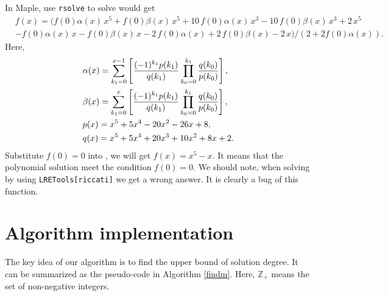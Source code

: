 \begin{example}
In Maple, use \texttt{rsolve} to solve  would get
\begin{equation}
\begin{split}
    &f(x)=(f \left( 0 \right) \alpha(x)\,{x}^{5}+f \left( 0 \right) \beta(x)\,{x}^{5}+10\,f \left( 0 \right) \alpha(x)\,{x}^{3}-10\,f \left( 0 \right) \beta(x)\,{x}^{3}+2\,{x}^{5}\\
    &-f \left( 0 \right) \alpha(x)\,x-f \left( 0 \right) \beta(x)\,x-2\,f \left( 0 \right) \alpha(x)+2\,f \left( 0 \right) \beta(x)-2\,x)/(2+2f(0)\alpha(x)) . 
\end{split} \label{rasol_real}
\end{equation}
Here,
\begin{equation}
\begin{split}
&\alpha(x)=\sum_{k_1=0}^{x-1}\left[
    \frac{(-1)^{k_1}p(k_1)}{q(k_1)}\prod_{k_0=0}^{k_1}{
        \frac{q(k_0)}{p(k_0)}
    }
\right], \\
&\beta(x)=\sum_{k_1=0}^{x}\left[
    \frac{(-1)^{k_1}p(k_1)}{q(k_1)}\prod_{k_0=0}^{k_1}{
        \frac{q(k_0)}{p(k_0)}
    }
\right], \\
&p(x)=x^5+5x^4-20x^2-26x+8, \\
&q(x)=x^5+5x^4+20x^3+10x^2+8x+2. 
\end{split}
\end{equation}
Substitute $f(0)=0$ into , we will get $f(x)=x^5-x$. It means that the polynomial solution meet the condition $f(0)=0$. We should note, when solving  by using \texttt{LRETools[riccati]} we get a wrong answer. It is clearly a bug of this function.
\end{example}

\section{Algorithm implementation} \label{implementation-02}

The key idea of our algorithm is to find the upper bound of solution degree. It can be summarized as the pseudo-code in Algorithm \ref{findm}. Here, $\mathbb Z_+$ means the set of non-negative integers.

